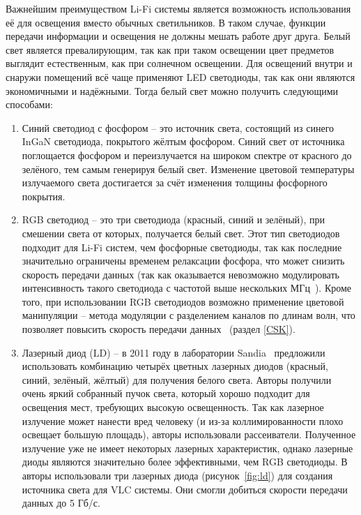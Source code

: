 Важнейшим преимуществом Li-Fi системы является возможность использования её для освещения вместо обычных светильников. В таком случае, функции передачи информации и освещения не должны мешать работе друг друга. Белый свет является превалирующим, так как при таком освещении цвет предметов выглядит естественным, как при солнечном освещении. Для освещений внутри и снаружи помещений всё чаще применяют LED светодиоды, так как они являются экономичными и надёжными. Тогда белый свет можно получить следующими способами:


\begin{enumerate}
    \item Синий светодиод с фосфором \--- это источник света, состоящий из синего InGaN светодиода, покрытого жёлтым фосфором. Синий свет от источника поглощается фосфором и переизлучается на широком спектре от красного до зелёного, тем самым генерируя белый свет. Изменение цветовой температуры излучаемого света достигается за счёт изменения толщины фосфорного покрытия. 
    \item RGB светодиод \--- это три светодиода (красный, синий и зелёный), при смешении света от которых, получается белый свет. Этот тип светодиодов подходит для Li-Fi систем, чем фосфорные светодиоды, так как последние значительно ограничены временем релаксации фосфора, что может снизить скорость передачи данных (так как оказывается невозможно модулировать интенсивность такого светодиода с частотой выше нескольких МГц~\cite{Khalid2012}). Кроме того, при использовании RGB светодиодов возможно применение цветовой манипуляции \--- метода модуляции с разделением каналов по длинам волн, что позволяет повысить скорость передачи данных~\cite{Bian2019} (раздел \ref{CSK}).
    \item Лазерный диод (LD) \--- в 2011 году в лаборатории Sandia~\cite{Neumann2011} предложили использовать комбинацию четырёх цветных лазерных диодов (красный, синий, зелёный, жёлтый) для получения белого света. Авторы получили очень яркий собранный пучок света, который хорошо подходит для освещения мест, требующих высокую освещенность. Так как лазерное излучение может нанести вред человеку (и из-за коллимированности плохо освещает большую площадь), авторы использовали рассеиватели. Полученное излучение уже не имеет некоторых лазерных характеристик, однако лазерные диоды являются значительно более эффективными, чем RGB светодиоды. В~\cite{Hussein2015} авторы использовали три лазерных диода (рисунок~\ref{fig:ld}) для создания источника света для VLC системы. Они смогли добиться скорости передачи данных до 5 Гб/с. 
\end{enumerate}

